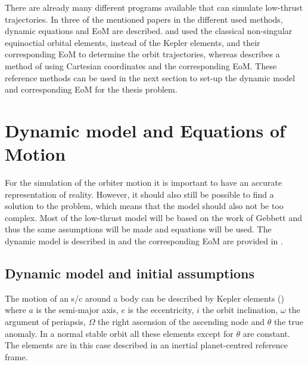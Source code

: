 There are already many different programs available that can simulate low-thrust trajectories. In three of the mentioned papers in  the different used methods, dynamic equations and \ac{EoM} are described. \cite{geffroy1997optimal} and \cite{kluever1998direct} used the classical non-singular equinoctial orbital elements, instead of the Kepler elements, and their corresponding \ac{EoM} to determine the orbit trajectories, whereas \cite{whiffen2006mystic} describes a method of using Cartesian coordinates and the corresponding \ac{EoM}. These reference methods can be used in the next section to set-up the  dynamic model and corresponding \ac{EoM} for the thesis problem.


\section{Dynamic model and Equations of Motion}
\label{sec:orbEoM}
For the simulation of the orbiter motion it is important to have an accurate representation of reality. However, it should also still be possible to find a solution to the problem, which means that the model should also not be too complex. Most of the low-thrust model will be based on the work of Gebbett \cite{gebbett2014multi} and thus the same assumptions will be made and equations will be used. The dynamic model is described in  and the corresponding \ac{EoM} are provided in .

%

\subsection{Dynamic model and initial assumptions}
\label{subsec:dynmod_orb}
The motion of an \ac{s/c} around a body can be described by Kepler elements () where $a$ is the semi-major axis, $e$ is the eccentricity, $i$ the orbit inclination, $\omega$ the argument of periapsis, $\Omega$ the right ascension of the ascending node and $\theta$ the true anomaly. In a normal stable orbit all these elements except for $\theta$ are constant. The elements are in this case described in an inertial planet-centred reference frame.


